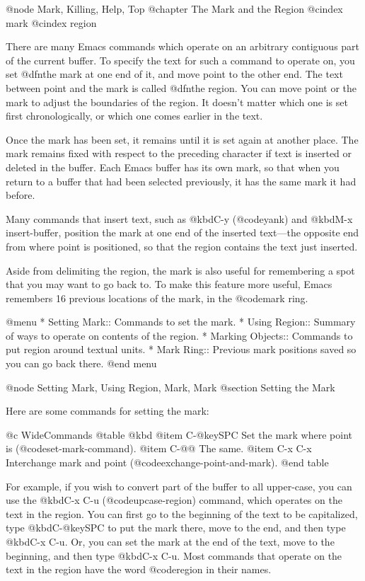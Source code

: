 {{{{{{@node Mark, Killing, Help, Top
@chapter The Mark and the Region
@cindex mark
@cindex region

  There are many Emacs commands which operate on an arbitrary contiguous
part of the current buffer.  To specify the text for such a command to
operate on, you set @dfn{the mark} at one end of it, and move point to the
other end.  The text between point and the mark is called @dfn{the region}.
You can move point or the mark to adjust the boundaries of the region.  It
doesn't matter which one is set first chronologically, or which one comes
earlier in the text.

  Once the mark has been set, it remains until it is set again at another
place.  The mark remains fixed with respect to the preceding character if
text is inserted or deleted in the buffer.  Each Emacs buffer has its own
mark, so that when you return to a buffer that had been selected
previously, it has the same mark it had before.

  Many commands that insert text, such as @kbd{C-y} (@code{yank}) and
@kbd{M-x insert-buffer}, position the mark at one end of the inserted
text---the opposite end from where point is positioned, so that the region
contains the text just inserted.

  Aside from delimiting the region, the mark is also useful for remembering
a spot that you may want to go back to.  To make this feature more useful,
Emacs remembers 16 previous locations of the mark, in the @code{mark ring}.

@menu
* Setting Mark::	Commands to set the mark.
* Using Region::	Summary of ways to operate on contents of the region.
* Marking Objects::	Commands to put region around textual units.
* Mark Ring::   Previous mark positions saved so you can go back there.
@end menu

@node Setting Mark, Using Region, Mark, Mark
@section Setting the Mark

  Here are some commands for setting the mark:

@c WideCommands
@table @kbd
@item C-@key{SPC}
Set the mark where point is (@code{set-mark-command}).
@item C-@@
The same.
@item C-x C-x
Interchange mark and point (@code{exchange-point-and-mark}).
@end table

  For example, if you wish to convert part of the buffer to all upper-case,
you can use the @kbd{C-x C-u} (@code{upcase-region}) command, which operates
on the text in the region.  You can first go to the beginning of the text
to be capitalized, type @kbd{C-@key{SPC}} to put the mark there, move to
the end, and then type @kbd{C-x C-u}.  Or, you can set the mark at the end
of the text, move to the beginning, and then type @kbd{C-x C-u}.  Most
commands that operate on the text in the region have the word @code{region}
in their names.

}}}}}}
